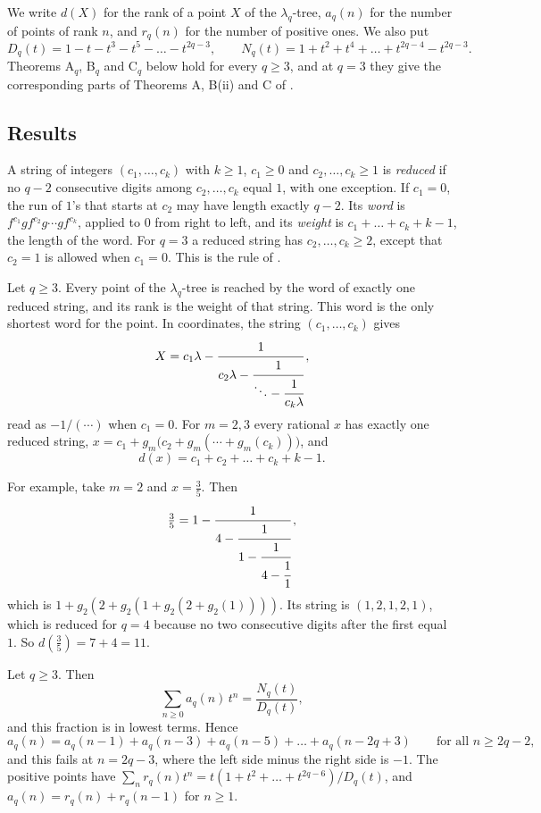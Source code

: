 We write $d(X)$ for the rank of a point $X$ of the $\lambda_q$-tree, $a_q(n)$ for the number of points
of rank $n$, and $r_q(n)$ for the number of positive ones. We also put
\[
D_q(t)=1-t-t^3-t^5-\dots-t^{2q-3},\qquad
N_q(t)=1+t^2+t^4+\dots+t^{2q-4}-t^{2q-3}.
\]
Theorems A$_q$, B$_q$ and C$_q$ below hold for every $q\ge3$, and at $q=3$ they give the
corresponding parts of Theorems A, B(ii) and C of \cite{P137}.

\subsection{Results}

A string of integers $(c_1,\dots,c_k)$ with $k\ge1$, $c_1\ge0$ and $c_2,\dots,c_k\ge1$ is
\emph{reduced} if no $q-2$ consecutive digits among $c_2,\dots,c_k$ equal $1$, with one exception. If
$c_1=0$, the run of $1$'s that starts at $c_2$ may have length exactly $q-2$. Its \emph{word} is
$f^{c_1}gf^{c_2}g\cdots gf^{c_k}$, applied to $0$ from right to left, and its \emph{weight} is
$c_1+\dots+c_k+k-1$, the length of the word. For $q=3$ a reduced string has $c_2,\dots,c_k\ge2$, except
that $c_2=1$ is allowed when $c_1=0$. This is the rule of \cite[Theorem~B]{P137}.

\begin{thmB}
Let $q\ge3$. Every point of the $\lambda_q$-tree is reached by the word of exactly one reduced string,
and its rank is the weight of that string. This word is the only shortest word for the point. In
coordinates, the string $(c_1,\dots,c_k)$ gives
\[
X=c_1\lambda-\cfrac{1}{c_2\lambda-\cfrac{1}{\ddots-\cfrac{1}{c_k\lambda}}}\,,
\]
read as $-1/(\cdots)$ when $c_1=0$. For $m=2,3$ every rational $x$ has exactly one reduced string,
$x=c_1+g_m\bigl(c_2+g_m(\cdots+g_m(c_k))\bigr)$, and
\[
d(x)=c_1+c_2+\dots+c_k+k-1 .
\]
\end{thmB}

For example, take $m=2$ and $x=\tfrac35$. Then
\[
\tfrac35=1-\cfrac{1}{4-\cfrac{1}{1-\cfrac{1}{4-\cfrac11}}}\,,
\]
which is $1+g_2(2+g_2(1+g_2(2+g_2(1))))$. Its string is $(1,2,1,2,1)$, which is reduced for $q=4$
because no two consecutive digits after the first equal $1$. So $d(\tfrac35)=7+4=11$.

\begin{thmA}
Let $q\ge3$. Then
\[
\sum_{n\ge0}a_q(n)\,t^n=\frac{N_q(t)}{D_q(t)},
\]
and this fraction is in lowest terms. Hence
\[
a_q(n)=a_q(n-1)+a_q(n-3)+a_q(n-5)+\dots+a_q(n-2q+3)\qquad\text{for all }n\ge2q-2,
\]
and this fails at $n=2q-3$, where the left side minus the right side is $-1$. The positive points
have $\sum_n r_q(n)t^n=t(1+t^2+\dots+t^{2q-6})/D_q(t)$, and $a_q(n)=r_q(n)+r_q(n-1)$ for $n\ge1$.
\end{thmA}

